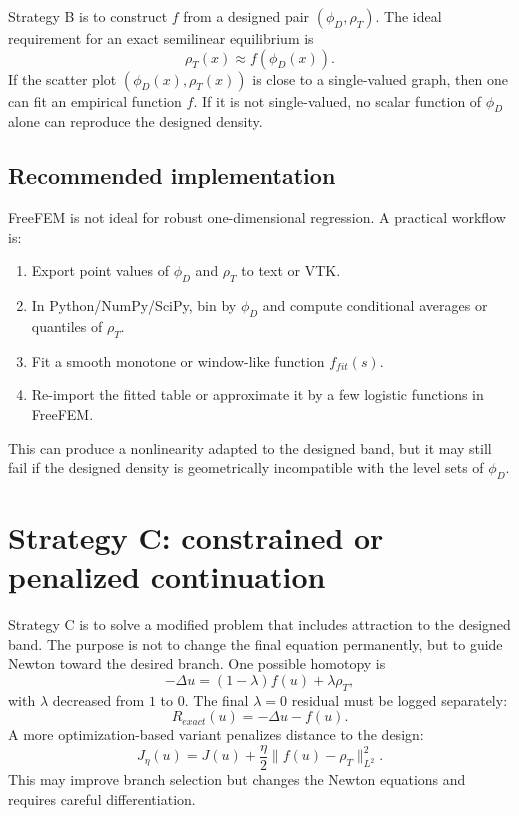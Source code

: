 \documentclass[11pt,a4paper]{article}
\begin{document}
Strategy B is to construct $f$ from a designed pair $(\phi_D,\rho_T)$. The ideal requirement for an exact semilinear equilibrium is
\begin{equation}
  \rho_T(x)\approx f(\phi_D(x)).
\end{equation}
If the scatter plot $(\phi_D(x),\rho_T(x))$ is close to a single-valued graph, then one can fit an empirical function $f$. If it is not single-valued, no scalar function of $\phi_D$ alone can reproduce the designed density.

\subsection{Recommended implementation}

FreeFEM is not ideal for robust one-dimensional regression. A practical workflow is:
\begin{enumerate}[leftmargin=2em]
  \item Export point values of $\phi_D$ and $\rho_T$ to text or VTK.
  \item In Python/NumPy/SciPy, bin by $\phi_D$ and compute conditional averages or quantiles of $\rho_T$.
  \item Fit a smooth monotone or window-like function $f_{fit}(s)$.
  \item Re-import the fitted table or approximate it by a few logistic functions in FreeFEM.
\end{enumerate}

This can produce a nonlinearity adapted to the designed band, but it may still fail if the designed density is geometrically incompatible with the level sets of $\phi_D$.

\section{Strategy C: constrained or penalized continuation}

Strategy C is to solve a modified problem that includes attraction to the designed band. The purpose is not to change the final equation permanently, but to guide Newton toward the desired branch. One possible homotopy is
\begin{equation}
  -\Delta u = (1-\lambda)f(u)+\lambda\rho_T,
\end{equation}
with $\lambda$ decreased from $1$ to $0$. The final $\lambda=0$ residual must be logged separately:
\begin{equation}
  R_{exact}(u)= -\Delta u-f(u).
\end{equation}
A more optimization-based variant penalizes distance to the design:
\begin{equation}
  J_\eta(u)=J(u)+\frac{\eta}{2}\|f(u)-\rho_T\|_{L^2}^2.
\end{equation}
This may improve branch selection but changes the Newton equations and requires careful differentiation.
\end{document}
